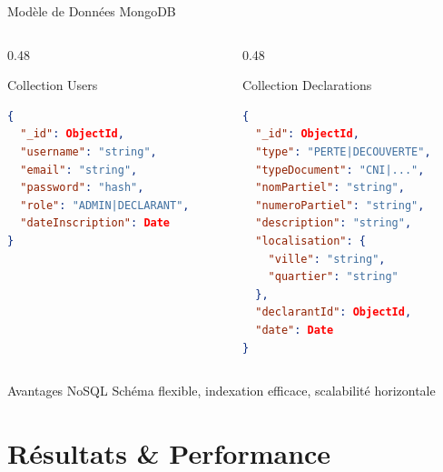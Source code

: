 \documentclass[aspectratio=169]{beamer}
\begin{document}
\begin{frame}[fragile]{Modèle de Données MongoDB}
    \begin{columns}[T]
        \begin{column}{0.48\textwidth}
            \begin{block}{Collection Users}
                \small
\begin{lstlisting}[language=json]
{
  "_id": ObjectId,
  "username": "string",
  "email": "string",
  "password": "hash",
  "role": "ADMIN|DECLARANT",
  "dateInscription": Date
}
\end{lstlisting}
            \end{block}
        \end{column}
        \begin{column}{0.48\textwidth}
            \begin{block}{Collection Declarations}
                \small
\begin{lstlisting}[language=json]
{
  "_id": ObjectId,
  "type": "PERTE|DECOUVERTE",
  "typeDocument": "CNI|...",
  "nomPartiel": "string",
  "numeroPartiel": "string",
  "description": "string",
  "localisation": {
    "ville": "string",
    "quartier": "string"
  },
  "declarantId": ObjectId,
  "date": Date
}
\end{lstlisting}
            \end{block}
        \end{column}
    \end{columns}

    \vspace{0.3cm}

    \begin{exampleblock}{Avantages NoSQL}
        Schéma flexible, indexation efficace, scalabilité horizontale
    \end{exampleblock}
\end{frame}

\section{Résultats \& Performance}
\end{document}
